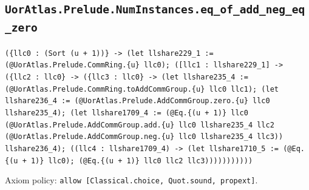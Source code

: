 \documentclass[11pt]{article}
\begin{document}
\subsection*{\texttt{UorAtlas.Prelude.NumInstances.eq\_of\_add\_neg\_eq\_zero}}
\noindent\texttt{(\{llc0 : (Sort (u + 1))\} -> (let llshare229\_1 := (@UorAtlas.Prelude.CommRing.\{u\} llc0); ([llc1 : llshare229\_1] -> (\{llc2 : llc0\} -> (\{llc3 : llc0\} -> (let llshare235\_4 := (@UorAtlas.Prelude.CommRing.toAddCommGroup.\{u\} llc0 llc1); (let llshare236\_4 := (@UorAtlas.Prelude.AddCommGroup.zero.\{u\} llc0 llshare235\_4); (let llshare1709\_4 := (@Eq.\{(u + 1)\} llc0 (@UorAtlas.Prelude.AddCommGroup.add.\{u\} llc0 llshare235\_4 llc2 (@UorAtlas.Prelude.AddCommGroup.neg.\{u\} llc0 llshare235\_4 llc3)) llshare236\_4); ((llc4 : llshare1709\_4) -> (let llshare1710\_5 := (@Eq.\{(u + 1)\} llc0); (@Eq.\{(u + 1)\} llc0 llc2 llc3)))))))))))}\par
\noindent Axiom policy: \texttt{allow [Classical.choice, Quot.sound, propext]}.\par
\end{document}
